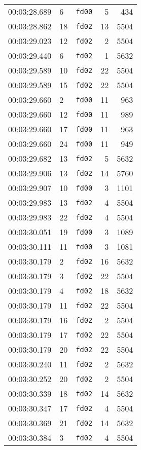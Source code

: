 \documentclass{article}
\begin{document}
\begin{longtable}{lllrr}
00:03:28.689 & 6 & \texttt{fd00} & 5 & 434 \\
00:03:28.862 & 18 & \texttt{fd02} & 13 & 5504 \\
00:03:29.023 & 12 & \texttt{fd02} & 2 & 5504 \\
00:03:29.440 & 6 & \texttt{fd02} & 1 & 5632 \\
00:03:29.589 & 10 & \texttt{fd02} & 22 & 5504 \\
00:03:29.589 & 15 & \texttt{fd02} & 22 & 5504 \\
00:03:29.660 & 2 & \texttt{fd00} & 11 & 963 \\
00:03:29.660 & 12 & \texttt{fd00} & 11 & 989 \\
00:03:29.660 & 17 & \texttt{fd00} & 11 & 963 \\
00:03:29.660 & 24 & \texttt{fd00} & 11 & 949 \\
00:03:29.682 & 13 & \texttt{fd02} & 5 & 5632 \\
00:03:29.906 & 13 & \texttt{fd02} & 14 & 5760 \\
00:03:29.907 & 10 & \texttt{fd00} & 3 & 1101 \\
00:03:29.983 & 13 & \texttt{fd02} & 4 & 5504 \\
00:03:29.983 & 22 & \texttt{fd02} & 4 & 5504 \\
00:03:30.051 & 19 & \texttt{fd00} & 3 & 1089 \\
00:03:30.111 & 11 & \texttt{fd00} & 3 & 1081 \\
00:03:30.179 & 2 & \texttt{fd02} & 16 & 5632 \\
00:03:30.179 & 3 & \texttt{fd02} & 22 & 5504 \\
00:03:30.179 & 4 & \texttt{fd02} & 18 & 5632 \\
00:03:30.179 & 11 & \texttt{fd02} & 22 & 5504 \\
00:03:30.179 & 16 & \texttt{fd02} & 2 & 5504 \\
00:03:30.179 & 17 & \texttt{fd02} & 22 & 5504 \\
00:03:30.179 & 20 & \texttt{fd02} & 22 & 5504 \\
00:03:30.240 & 11 & \texttt{fd02} & 2 & 5632 \\
00:03:30.252 & 20 & \texttt{fd02} & 2 & 5504 \\
00:03:30.339 & 18 & \texttt{fd02} & 14 & 5632 \\
00:03:30.347 & 17 & \texttt{fd02} & 4 & 5504 \\
00:03:30.369 & 21 & \texttt{fd02} & 14 & 5632 \\
00:03:30.384 & 3 & \texttt{fd02} & 4 & 5504 \\

\end{longtable}
\end{document}

